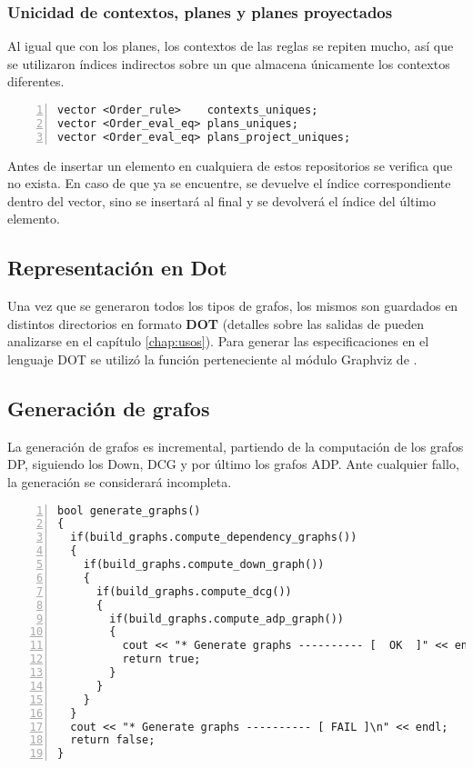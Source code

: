 \subsubsection{Unicidad de contextos, planes y planes proyectados}

Al igual que con los planes, los contextos de las reglas se repiten mucho, así que se utilizaron índices indirectos sobre un  que almacena únicamente los contextos diferentes.

\begin{lstlisting}[numbers=left, linewidth=9cm]
vector <Order_rule>    contexts_uniques;
vector <Order_eval_eq> plans_uniques;
vector <Order_eval_eq> plans_project_uniques;
\end{lstlisting}

Antes de insertar un elemento en cualquiera de estos repositorios se verifica que no exista. En caso de que ya se encuentre, se devuelve el índice correspondiente dentro del vector, sino se insertará al final y se devolverá el índice del último elemento.

\subsection{Representación en Dot}

Una vez que se generaron todos los tipos de grafos, los mismos son guardados en distintos directorios en formato \textbf{DOT}\cite{dot} (detalles sobre las salidas de \maggen pueden analizarse en el capítulo \ref{chap:usos}). Para generar las especificaciones en el lenguaje DOT se utilizó la función  perteneciente al módulo Graphviz de \boost.

\subsection{Generación de grafos}

La generación de grafos es incremental, partiendo de la computación de los grafos DP, siguiendo los Down, DCG y por último los grafos ADP. Ante cualquier fallo, la generación se considerará incompleta.

\begin{lstlisting}[numbers=left, columns=fullflexible, linewidth=11.3cm]
bool generate_graphs()
{
  if(build_graphs.compute_dependency_graphs())
  {
    if(build_graphs.compute_down_graph())
    {
      if(build_graphs.compute_dcg())
      {
        if(build_graphs.compute_adp_graph())
        {
          cout << "* Generate graphs ---------- [  OK  ]" << endl;
          return true;
        }
      }
    }
  }
  cout << "* Generate graphs ---------- [ FAIL ]\n" << endl;
  return false;
}
\end{lstlisting}

